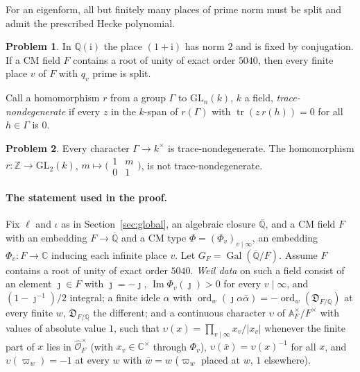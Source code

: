 \documentclass[reqno]{amsart}
\theoremstyle{definition}
\newtheorem{problem}{Problem}[section]
\theoremstyle{plain}
\newcommand{\Z}{\mathbb{Z}}
\newcommand{\Q}{\mathbb{Q}}
\newcommand{\C}{\mathbb{C}}
\newcommand{\A}{\mathbb{A}}
\newcommand{\Oc}{\mathcal{O}}
\newcommand{\Gal}{\operatorname{Gal}}
\newcommand{\GL}{\mathrm{GL}}
\newcommand{\tr}{\operatorname{tr}}
\newcommand{\ord}{\operatorname{ord}}
\newcommand{\ii}{\mathrm{i}}
\begin{document}
For an eigenform, all but finitely many places of prime norm must be split and admit the prescribed Hecke polynomial.

\begin{problem}\label{pr:split}
In \(\Q(\ii)\) the place \((1 + \ii)\) has norm \(2\) and is fixed by conjugation.  If a CM field \(F\) contains a root of unity of exact order \(5040\), then every finite place \(v\) of \(F\) with \(q_v\) prime is split.
\end{problem}

Call a homomorphism \(r\) from a group \(\Gamma\) to \(\GL_n(k)\), \(k\) a field, \emph{trace-nondegenerate} if every \(z\) in the \(k\)-span of \(r(\Gamma)\) with \(\tr(z\,r(h)) = 0\) for all \(h \in \Gamma\) is \(0\).

\begin{problem}\label{pr:trace-nondeg}
Every character \(\Gamma \to k^\times\) is trace-nondegenerate.  The homomorphism \(r \colon \Z \to \GL_2(k)\), \(m \mapsto \bigl(\begin{smallmatrix} 1 & m \\ 0 & 1 \end{smallmatrix}\bigr)\), is not trace-nondegenerate.
\end{problem}

\paragraph{The statement used in the proof.}
Fix \(\ell\) and \(\iota\) as in Section~\ref{sec:global}, an algebraic closure \(\overline{\Q}\), and a CM field \(F\) with an embedding \(F \to \overline{\Q}\) and a CM type \(\Phi = (\Phi_v)_{v \mid \infty}\), an embedding \(\Phi_v \colon F \to \C\) inducing each infinite place \(v\).  Let \(G_F = \Gal(\overline{\Q}/F)\).  Assume \(F\) contains a root of unity of exact order \(5040\).  \emph{Weil data} on such a field consist of an element \(\jmath \in F\) with \(\bar\jmath = -\jmath\), \(\operatorname{Im}\Phi_v(\jmath) > 0\) for every \(v \mid \infty\), and \((1 - \jmath^{-1})/2\) integral; a finite idele \(\alpha\) with \(\ord_w(\jmath\alpha\bar\alpha) = -\ord_w(\mathfrak{D}_{F/\Q})\) at every finite \(w\), \(\mathfrak{D}_{F/\Q}\) the different; and a continuous character \(\upsilon\) of \(\A_F^\times/F^\times\) with values of absolute value \(1\), such that \(\upsilon(x) = \prod_{v \mid \infty} x_v/\lvert x_v\rvert\) whenever the finite part of \(x\) lies in \(\widehat{\Oc}_F^\times\) (with \(x_v \in \C^\times\) through \(\Phi_v\)), \(\upsilon(\bar x) = \upsilon(x)^{-1}\) for all \(x\), and \(\upsilon(\varpi_w) = -1\) at every \(w\) with \(\bar w = w\) (\(\varpi_w\) placed at \(w\), \(1\) elsewhere).
\end{document}
